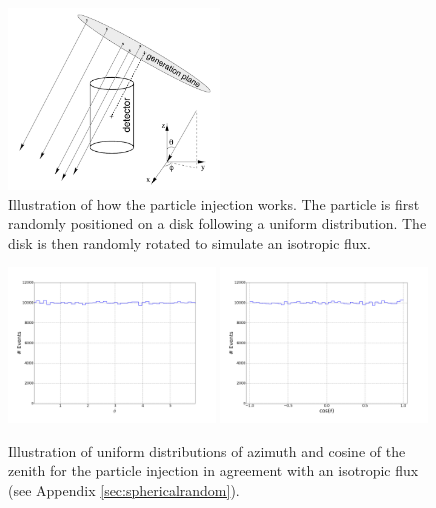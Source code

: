 \begin{figure}[t]
\centering
\includegraphics[width=0.5\textwidth]{chapter6/img/GenerationDisk.png}
\caption{Illustration of how the particle injection works. The particle is first randomly positioned on a disk following a uniform distribution. The disk is then randomly rotated to simulate an isotropic flux.}
\label{fig:injector}
\end{figure}

\begin{figure}[t]
\centering
\includegraphics[width=0.49\textwidth]{chapter6/img/Azimuth}
\includegraphics[width=0.49\textwidth]{chapter6/img/Zenith_full}
\caption{Illustration of uniform distributions of azimuth and cosine of the zenith for the particle injection in agreement with an isotropic flux (see Appendix \ref{sec:sphericalrandom}).
}
\label{fig:angles}
\end{figure}

